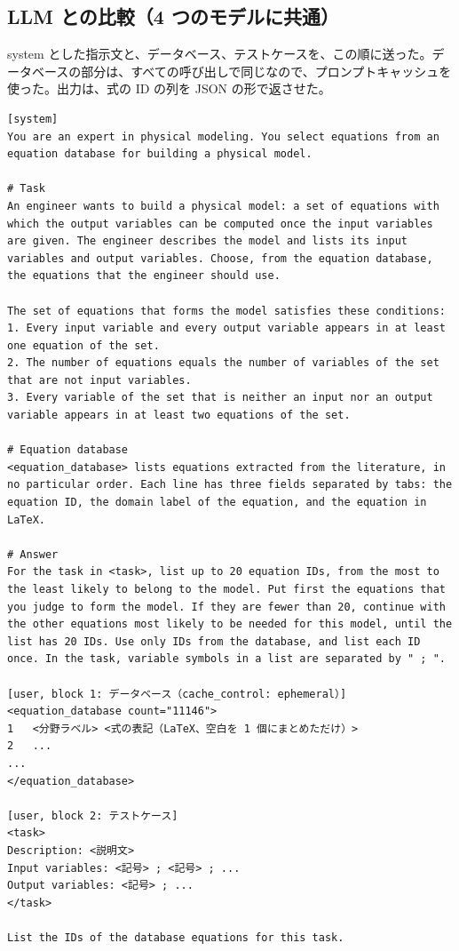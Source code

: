\documentclass[11pt,a4paper]{ltjsarticle}
\begin{document}
\subsection{LLM との比較（4 つのモデルに共通）}
system とした指示文と、データベース、テストケースを、この順に送った。データベースの部分は、すべての呼び出しで同じなので、プロンプトキャッシュを使った。出力は、式の ID の列を JSON の形で返させた。
\begin{Verbatim}[fontsize=\scriptsize, breaklines=true, frame=single]
[system]
You are an expert in physical modeling. You select equations from an equation database for building a physical model.

# Task
An engineer wants to build a physical model: a set of equations with which the output variables can be computed once the input variables are given. The engineer describes the model and lists its input variables and output variables. Choose, from the equation database, the equations that the engineer should use.

The set of equations that forms the model satisfies these conditions:
1. Every input variable and every output variable appears in at least one equation of the set.
2. The number of equations equals the number of variables of the set that are not input variables.
3. Every variable of the set that is neither an input nor an output variable appears in at least two equations of the set.

# Equation database
<equation_database> lists equations extracted from the literature, in no particular order. Each line has three fields separated by tabs: the equation ID, the domain label of the equation, and the equation in LaTeX.

# Answer
For the task in <task>, list up to 20 equation IDs, from the most to the least likely to belong to the model. Put first the equations that you judge to form the model. If they are fewer than 20, continue with the other equations most likely to be needed for this model, until the list has 20 IDs. Use only IDs from the database, and list each ID once. In the task, variable symbols in a list are separated by " ; ".

[user, block 1: データベース（cache_control: ephemeral）]
<equation_database count="11146">
1	<分野ラベル>	<式の表記（LaTeX、空白を 1 個にまとめただけ）>
2	...
...
</equation_database>

[user, block 2: テストケース]
<task>
Description: <説明文>
Input variables: <記号> ; <記号> ; ...
Output variables: <記号> ; ...
</task>

List the IDs of the database equations for this task.
\end{Verbatim}
\end{document}
